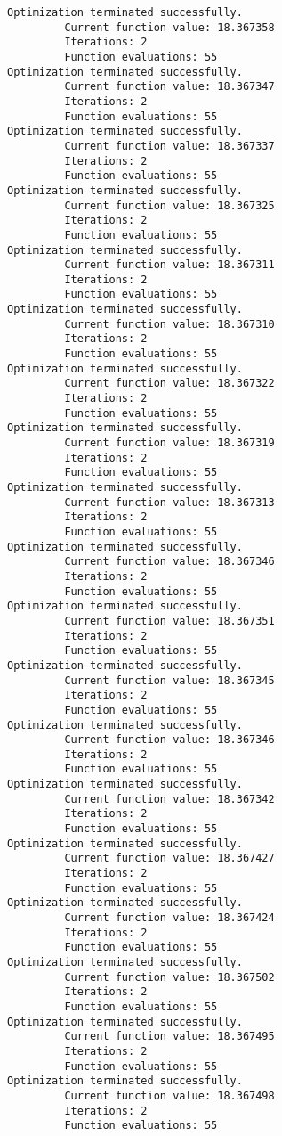 \documentclass[11pt]{article}
\begin{document}
\begin{Verbatim}[commandchars=\\\{\}]
Optimization terminated successfully.
         Current function value: 18.367358
         Iterations: 2
         Function evaluations: 55
Optimization terminated successfully.
         Current function value: 18.367347
         Iterations: 2
         Function evaluations: 55
Optimization terminated successfully.
         Current function value: 18.367337
         Iterations: 2
         Function evaluations: 55
Optimization terminated successfully.
         Current function value: 18.367325
         Iterations: 2
         Function evaluations: 55
Optimization terminated successfully.
         Current function value: 18.367311
         Iterations: 2
         Function evaluations: 55
Optimization terminated successfully.
         Current function value: 18.367310
         Iterations: 2
         Function evaluations: 55
Optimization terminated successfully.
         Current function value: 18.367322
         Iterations: 2
         Function evaluations: 55
Optimization terminated successfully.
         Current function value: 18.367319
         Iterations: 2
         Function evaluations: 55
Optimization terminated successfully.
         Current function value: 18.367313
         Iterations: 2
         Function evaluations: 55
Optimization terminated successfully.
         Current function value: 18.367346
         Iterations: 2
         Function evaluations: 55
Optimization terminated successfully.
         Current function value: 18.367351
         Iterations: 2
         Function evaluations: 55
Optimization terminated successfully.
         Current function value: 18.367345
         Iterations: 2
         Function evaluations: 55
Optimization terminated successfully.
         Current function value: 18.367346
         Iterations: 2
         Function evaluations: 55
Optimization terminated successfully.
         Current function value: 18.367342
         Iterations: 2
         Function evaluations: 55
Optimization terminated successfully.
         Current function value: 18.367427
         Iterations: 2
         Function evaluations: 55
Optimization terminated successfully.
         Current function value: 18.367424
         Iterations: 2
         Function evaluations: 55
Optimization terminated successfully.
         Current function value: 18.367502
         Iterations: 2
         Function evaluations: 55
Optimization terminated successfully.
         Current function value: 18.367495
         Iterations: 2
         Function evaluations: 55
Optimization terminated successfully.
         Current function value: 18.367498
         Iterations: 2
         Function evaluations: 55

\end{Verbatim}
\end{document}
